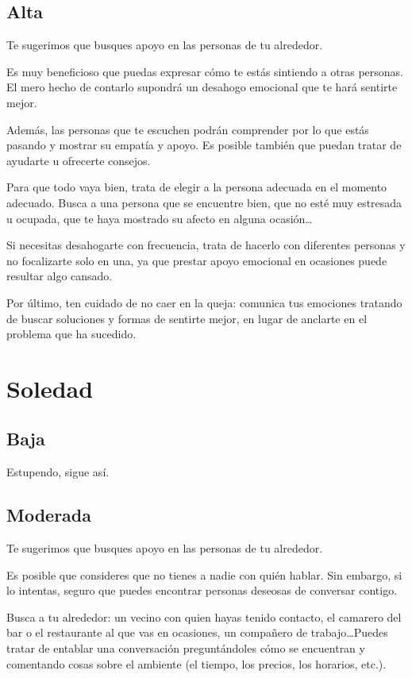         \subsection{Alta}
            Te sugerimos que busques apoyo en las personas de tu alrededor.

            Es muy beneficioso que puedas expresar cómo te estás sintiendo a otras personas. El mero hecho de contarlo supondrá un desahogo emocional que te hará sentirte mejor.
            
            Además, las personas que te escuchen podrán comprender por lo que estás pasando y mostrar su empatía y apoyo. Es posible también que puedan tratar de ayudarte u ofrecerte consejos.
            
            Para que todo vaya bien, trata de elegir a la persona adecuada en el momento adecuado. Busca a una persona que se encuentre bien, que no esté muy estresada u ocupada, que te haya mostrado su afecto en alguna ocasión…
            
            Si necesitas desahogarte con frecuencia, trata de hacerlo con diferentes personas y no focalizarte solo en una, ya que prestar apoyo emocional en ocasiones puede resultar algo cansado.
           
            Por último, ten cuidado de no caer en la queja: comunica tus emociones tratando de buscar soluciones y formas de sentirte mejor, en lugar de anclarte en el problema que ha sucedido.

    \section{Soledad}
        \subsection{Baja}
            Estupendo, sigue así. 
        \subsection{Moderada}
            Te sugerimos que busques apoyo en las personas de tu alrededor.

            Es posible que consideres que no tienes a nadie con quién hablar. Sin embargo, si lo intentas, seguro que puedes encontrar personas deseosas de conversar contigo.
            
            Busca a tu alrededor: un vecino con quien hayas tenido contacto, el camarero del bar o el restaurante al que vas en ocasiones, un compañero de trabajo…Puedes tratar de entablar una conversación preguntándoles cómo se encuentran y comentando cosas sobre el ambiente (el tiempo, los precios, los horarios, etc.).
            
